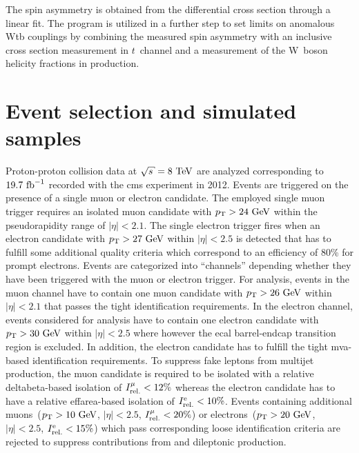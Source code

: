 The spin asymmetry is obtained from the differential cross section through a linear fit. The \TOPFIT program is utilized in a further step to set limits on anomalous Wtb couplings by combining the measured spin asymmetry with an inclusive cross section measurement in $t$~channel and a measurement of the W~boson helicity fractions in \ttbar production.



\section{Event selection and simulated samples}
\label{sec:polarization-selection}

Proton-proton collision data at $\sqrt{s}=8~\TeV$ are analyzed corresponding to $19.7~\mathrm{fb}^{-1}$ recorded with the \gls{cms} experiment in 2012. Events are triggered on the presence of a single muon or electron candidate. The employed single muon trigger requires an isolated muon candidate with $p_\mathrm{T}>24~\mathrm{GeV}$ within the pseudorapidity range of $|\eta|<2.1$. The single electron trigger fires when an electron candidate with $p_\mathrm{T}>27~\mathrm{GeV}$ within $|\eta|<2.5$ is detected that has to fulfill some additional quality criteria which correspond to an efficiency of 80\% for prompt electrons. Events are categorized into ``channels'' depending whether they have been triggered with the muon or electron trigger. For analysis, events in the muon channel have to contain one muon candidate with $p_\mathrm{T}>26~\mathrm{GeV}$ within $|\eta|<2.1$ that passes the tight identification requirements. In the electron channel, events considered for analysis have to contain one electron candidate with $p_\mathrm{T}>30~\mathrm{GeV}$ within $|\eta|<2.5$ where however the \gls{ecal} barrel-endcap transition region is excluded. In addition, the electron candidate has to fulfill the tight \gls{mva}-based identification requirements. To suppress fake leptons from multijet production, the muon candidate is required to be isolated with a relative \gls{deltabeta}-based isolation of $I_\mathrm{rel.}^{\mu}<12\%$ whereas the electron candidate has to have a relative \gls{effarea}-based isolation of $I_\mathrm{rel.}^\mathrm{e}<10\%$. Events containing additional muons~($p_\mathrm{T}>10~\mathrm{GeV}$, $|\eta|<2.5$, $I_\mathrm{rel.}^{\mu}<20\%$) or electrons~($p_\mathrm{T}>20~\mathrm{GeV}$, $|\eta|<2.5$, $I_\mathrm{rel.}^\mathrm{e}<15\%$) which pass corresponding loose identification criteria are rejected to suppress contributions from \zjets and dileptonic \ttbar production. 

